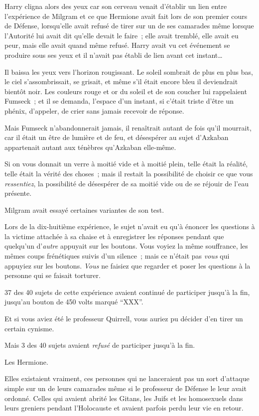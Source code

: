 Harry cligna alors des yeux car son cerveau venait d'établir un lien entre l'expérience de Milgram et ce que Hermione avait fait lors de son premier cours de Défense, lorsqu'elle avait refusé de tirer sur un de ses camarades même lorsque l'Autorité lui avait dit qu'elle devait le faire~; elle avait tremblé, elle avait eu peur, mais elle avait quand même refusé. Harry avait vu cet événement se produire sous ses yeux et il n'avait pas établi de lien avant cet instant…

Il baissa les yeux vers l'horizon rougissant. Le soleil sombrait de plus en plus bas, le ciel s'assombrissait, se grisait, et même s'il était encore bleu il deviendrait bientôt noir. Les couleurs rouge et or du soleil et de son coucher lui rappelaient Fumseck~; et il se demanda, l'espace d'un instant, si c'était triste d'être un phénix, d'appeler, de crier sans jamais recevoir de réponse.

Mais Fumseck n'abandonnerait jamais, il renaîtrait autant de fois qu'il mourrait, car il était un être de lumière et de feu, et désespérer au sujet d'Azkaban appartenait autant aux ténèbres qu'Azkaban elle-même.

Si on vous donnait un verre à moitié vide et à moitié plein, telle était la réalité, telle était la vérité des choses~; mais il restait la possibilité de choisir ce que vous \emph{ressentiez}, la possibilité de désespérer de sa moitié vide ou de se réjouir de l'eau présente.

Milgram avait essayé certaines variantes de son test.

Lors de la dix-huitième expérience, le sujet n'avait eu qu'à énoncer les questions à la victime attachée à sa chaise et à enregistrer les réponses pendant que quelqu'un d'\emph{autre} appuyait sur les boutons. Vous voyiez la même souffrance, les mêmes coups frénétiques suivis d'un silence~; mais ce n'était pas \emph{vous} qui appuyiez sur les boutons. \emph{Vous} ne faisiez que regarder et poser les questions à la personne qui se faisait torturer.

37 des 40 sujets de cette expérience avaient continué de participer jusqu'à la fin, jusqu'au bouton de 450 volts marqué “XXX”.

Et si vous aviez été le professeur Quirrell, vous auriez pu décider d'en tirer un certain cynisme.

Mais 3 des 40 sujets avaient \emph{refusé} de participer jusqu'à la fin.

Les Hermione.

Elles existaient vraiment, ces personnes qui ne lanceraient pas un sort d'attaque simple sur un de leurs camarades même si le professeur de Défense le leur avait ordonné. Celles qui avaient abrité les Gitans, les Juifs et les homosexuels dans leurs greniers pendant l'Holocauste et avaient parfois perdu leur vie en retour.

